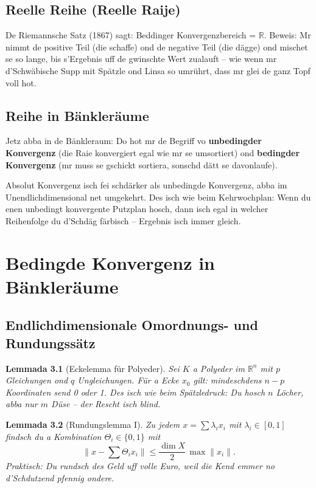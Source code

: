 \documentclass[12pt,a4paper]{scrbook}
\newtheorem{lemma}{Lemmada}[chapter]
\begin{document}
	\section{Reelle Reihe (Reelle Raije)}
	De Riemannsche Satz (1867) sagt: Beddinger Konvergenzbereich = \(\mathbb{R}\). Beweis: Mr nimmt de positive Teil (die schaffe) ond de negative Teil (die dägge) ond mischet se so lange, bis s’Ergebnis uff de gwinschte Wert zualauft – wie wenn mr d’Schwäbische Supp mit Spätzle ond Linsa so umrührt, dass mr glei de ganz Topf voll hot.
	
	\section{Reihe in Bänkleräume}
	Jetz abba in de Bänkleraum: Do hot mr de Begriff vo \textbf{unbedingder Konvergenz} (die Raie konvergiert egal wie mr se umsortiert) ond \textbf{bedingder Konvergenz} (mr muss se gschickt sortiera, sonschd dätt se davonlaufe).
	
	Absolut Konvergenz isch fei schdärker als unbedingde Konvergenz, abba im Unendlichdimensional net umgekehrt. Des isch wie beim Kehrwochplan: Wenn du enen unbedingt konvergente Putzplan hosch, dann isch egal in welcher Reihenfolge du d’Schdäg färbisch – Ergebnis isch immer gleich.
	
	\chapter{Bedingde Konvergenz in Bänkleräume}
	\section{Endlichdimensionale Omordnungs- und Rundungssätz}
	\begin{lemma}[Eckelemma für Polyeder]
		Sei \(K\) a Polyeder im \(\mathbb{R}^n\) mit \(p\) Gleichungen ond \(q\) Ungleichungen. Für a Ecke \(x_0\) gilt: mindeschdens \(n-p\) Koordinaten send 0 oder 1. Des isch wie beim Spätzledruck: Du hosch \(n\) Löcher, abba nur \(m\) Düse – der Rescht isch blind.
	\end{lemma}
	
	\begin{lemma}[Rundungslemma I]
		Zu jedem \(x = \sum \lambda_i x_i\) mit \(\lambda_i\in[0,1]\) findsch du a Kombination \(\Theta_i\in\{0,1\}\) mit 
		\[
		\bigl\|x - \sum \Theta_i x_i\bigr\| \le \frac{\dim X}{2}\,\max\|x_i\|.
		\]
		Praktisch: Du rundsch des Geld uff volle Euro, weil die Kend emmer no d’Schdutzend pfennig ondere.
	\end{lemma}
	
\end{document}
